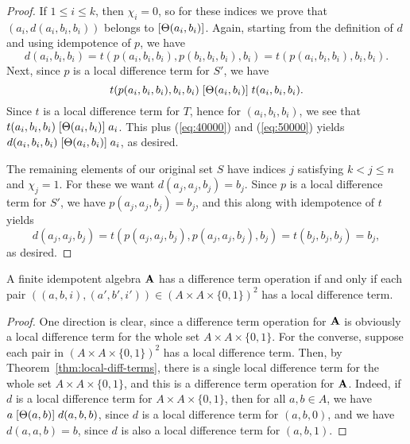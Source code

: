 \begin{proof}
If $1\leq i \leq k$, then $\chi_i =0$, so for these indices we prove
that $(a_i, d(a_i,b_i,b_i))$ belongs to $[\Theta(a_i,b_i)]$.
Again, starting from the definition of $d$ and using idempotence of $p$, we have
\begin{equation}
  \label{eq:40000}
  d(a_i,b_i,b_i) =
  t(p(a_i,b_i,b_i), p(b_i,b_i,b_i), b_i)=
  t(p(a_i,b_i,b_i), b_i, b_i).
\end{equation}
Next, since $p$ is a local difference term for $S'$, we have
\begin{equation}
  \label{eq:50000}
  t(p(a_i,b_i,b_i), b_i, b_i)
 \mathrel{[\Theta(a_i,b_i)]}
 t(a_i, b_i, b_i).
\end{equation}
Since $t$ is a local difference term for $T$, hence for
$(a_i, b_i, b_i)$,  %
we see that 
$t(a_i, b_i, b_i) \mathrel{[\Theta(a_i,b_i)]} a_i$.
This plus (\ref{eq:40000}) and (\ref{eq:50000}) yields
$d(a_i,b_i,b_i) \mathrel{[\Theta(a_i,b_i)]} a_i$,
as desired.

The remaining elements of our original set $S$
have indices $j$ satisfying $k<j\leq n$ and $\chi_j = 1$.
For these we want $d(a_j,a_j,b_j) = b_j$.
Since $p$ is a local difference term for $S'$, we have
$p(a_j,a_j,b_j) = b_j$, and this along with idempotence of $t$ yields
\[ d(a_j,a_j,b_j) =  t(p(a_j,a_j,b_j), p(a_j,a_j,b_j), b_j)=  t(b_j, b_j, b_j) =b_j,\]
as desired.
\end{proof}

\begin{cor}
  \label{cor:loc-diff-term}
  A finite idempotent algebra $\mathbf{A}$ has a difference term operation if and
  only if each pair $((a,b,i), (a',b',i')) \in (A\times A \times \{0,1\})^2$ has a local
  difference term.
\end{cor}
\begin{proof}
  One direction is clear, since a difference term operation for $\mathbf{A}$ is
  obviously a local difference term for the whole set 
  $A\times A \times \{0,1\}$.
  For the converse, suppose
  each pair in $(A\times A \times \{0,1\})^2$ has a local
  difference term. Then, by Theorem~\ref{thm:local-diff-terms},
  there is a single local difference term for the whole set $A\times A \times \{0,1\}$,
  and this is a difference term operation for $\mathbf{A}$.  Indeed, if $d$ is a
  local difference term for $A\times A \times \{0,1\}$, then 
  for all $a, b \in A$, we have
  $a \mathrel{[\Theta(a,b)]} d(a,b,b)$,
  since $d$ is a local difference term for $(a,b,0)$, and we have
  $d(a,a,b) = b$, since $d$ is also a local difference term for
  $(a,b,1)$.
\end{proof}

